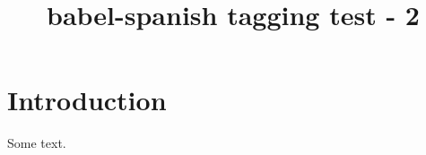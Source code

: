 \documentclass{article}
\title{babel-spanish tagging test - 2}
\begin{document}
\section{Introduction}
    Some text.
\end{document}
